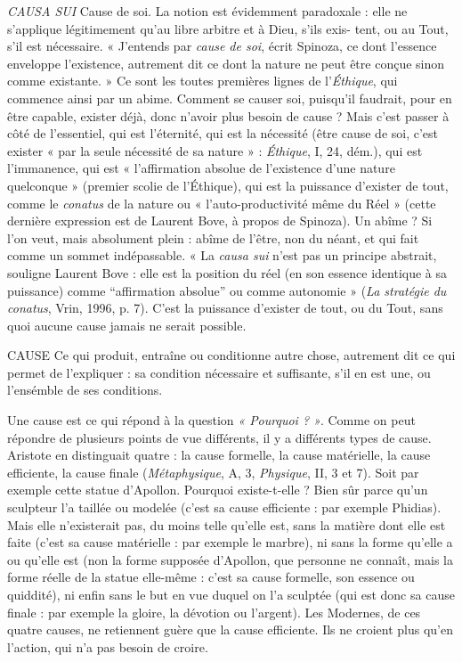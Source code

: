 {\it CAUSA SUI} Cause de soi. La notion est évidemment paradoxale : elle ne
s'applique légitimement qu’au libre arbitre et à Dieu, s’ils exis-
tent, ou au Tout, s’il est nécessaire. « J'entends par {\it cause de soi}, écrit Spinoza,
ce dont l’essence enveloppe l'existence, autrement dit ce dont la nature ne peut
être conçue sinon comme existante. » Ce sont les toutes premières lignes de
l’{\it Éthique}, qui commence ainsi par un abime. Comment se causer soi, puisqu'il
faudrait, pour en être capable, exister déjà, donc n’avoir plus besoin de cause ?
Mais c’est passer à côté de l'essentiel, qui est l’éternité, qui est la nécessité (être
cause de soi, c’est exister « par la seule nécessité de sa nature » : {\it Éthique}, I, 24,
dém.), qui est l’immanence, qui est « l'affirmation absolue de l’existence d’une
nature quelconque » (premier scolie de l’Éthique), qui est la puissance d’exister
de tout, comme le {\it conatus} de la nature ou « l’auto-productivité même du Réel »
(cette dernière expression est de Laurent Bove, à propos de Spinoza). Un
abîme ? Si l’on veut, mais absolument plein : abîme de l'être, non du néant, et
qui fait comme un sommet indépassable. « La {\it causa sui} n’est pas un principe
abstrait, souligne Laurent Bove : elle est la position du réel (en son essence
identique à sa puissance) comme “affirmation absolue” ou comme autonomie »
({\it La stratégie du conatus}, Vrin, 1996, p. 7). C’est la puissance d’exister de tout,
ou du Tout, sans quoi aucune cause jamais ne serait possible.

CAUSE Ce qui produit, entraîne ou conditionne autre chose, autrement dit
ce qui permet de l'expliquer : sa condition nécessaire et suffisante,
s’il en est une, ou l’ensémble de ses conditions.

Une cause est ce qui répond à la question {\it « Pourquoi ? »}. Comme on peut
répondre de plusieurs points de vue différents, il y a différents types de cause.
Aristote en distinguait quatre : la cause formelle, la cause matérielle, la cause
efficiente, la cause finale ({\it Métaphysique}, A, 3, {\it Physique}, II, 3 et 7). Soit par
exemple cette statue d’Apollon. Pourquoi existe-t-elle ? Bien sûr parce qu’un
sculpteur l’a taillée ou modelée (c’est sa cause efficiente : par exemple Phidias).
Mais elle n’existerait pas, du moins telle qu’elle est, sans la matière dont elle est
faite (c’est sa cause matérielle : par exemple le marbre), ni sans la forme qu’elle
a ou qu’elle est (non la forme supposée d’Apollon, que personne ne connaît,
mais la forme réelle de la statue elle-même : c’est sa cause formelle, son essence
ou quiddité), ni enfin sans le but en vue duquel on l’a sculptée (qui est donc sa
cause finale : par exemple la gloire, la dévotion ou l’argent). Les Modernes, de
ces quatre causes, ne retiennent guère que la cause efficiente. Ils ne croient plus
qu’en l’action, qui n’a pas besoin de croire.

